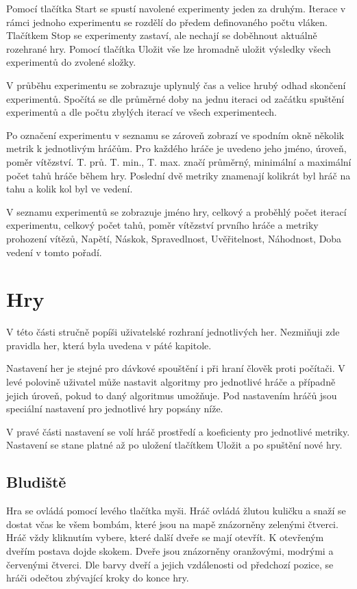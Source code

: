 Pomocí tlačítka Start se spustí navolené experimenty jeden za druhým. Iterace v rámci jednoho experimentu se rozdělí do předem definovaného počtu vláken. Tlačítkem Stop se experimenty zastaví, ale nechají se doběhnout aktuálně rozehrané hry. Pomocí tlačítka Uložit vše lze hromadně uložit výsledky všech experimentů do zvolené složky. 

V průběhu experimentu se zobrazuje uplynulý čas a velice hrubý odhad skončení experimentů. Spočítá se dle průměrné doby na jednu iteraci od začátku spuštění experimentů a dle počtu zbylých iterací ve všech experimentech.

Po označení experimentu v seznamu se zároveň zobrazí ve spodním okně několik metrik k jednotlivým hráčům. Pro každého hráče je uvedeno jeho jméno, úroveň, poměr vítězství. T. prů. T. min., T. max. značí průměrný, minimální a maximální počet tahů hráče během hry. Poslední dvě metriky znamenají kolikrát byl hráč na tahu a kolik kol byl ve vedení.

V seznamu experimentů se zobrazuje jméno hry, celkový a proběhlý počet iterací experimentu, celkový počet tahů, poměr vítězství prvního hráče a metriky prohození vítězů, Napětí, Náskok, Spravedlnost, Uvěřitelnost, Náhodnost, Doba vedení v tomto pořadí.

\section{Hry}

V této části stručně popíši uživatelské rozhraní jednotlivých her. Nezmiňuji zde pravidla her, která byla uvedena v páté kapitole.

Nastavení her je stejné pro dávkové spouštění i při hraní člověk proti počítači. V levé polovině uživatel může nastavit algoritmy pro jednotlivé hráče a případně jejich úroveň, pokud to daný algoritmus umožňuje. Pod nastavením hráčů jsou speciální nastavení pro jednotlivé hry popsány níže.

V pravé části nastavení se volí hráč prostředí a koeficienty pro jednotlivé metriky. Nastavení se stane platné až po uložení tlačítkem Uložit a po spuštění nové hry.

\subsection{Bludiště}

Hra se ovládá pomocí levého tlačítka myši. Hráč ovládá žlutou kuličku a snaží se dostat včas ke všem bombám, které jsou na mapě znázorněny zelenými čtverci. Hráč vždy kliknutím vybere, které další dveře se mají otevřít. K otevřeným dveřím postava dojde skokem. Dveře jsou znázorněny oranžovými, modrými a červenými čtverci. Dle barvy dveří a jejich vzdálenosti od předchozí pozice, se hráči odečtou zbývající kroky do konce hry.

